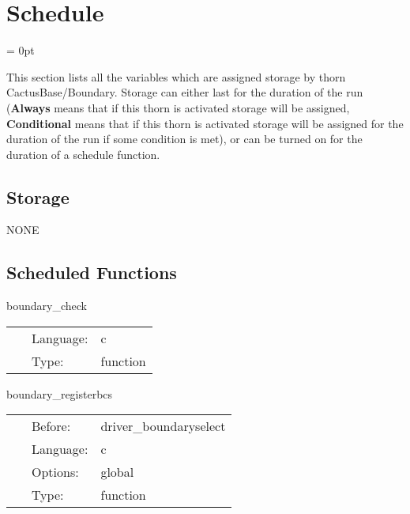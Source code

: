 
\section{Schedule} 


\parskip = 0pt


\noindent This section lists all the variables which are assigned storage by thorn CactusBase/Boundary.  Storage can either last for the duration of the run ({\bf Always} means that if this thorn is activated storage will be assigned, {\bf Conditional} means that if this thorn is activated storage will be assigned for the duration of the run if some condition is met), or can be turned on for the duration of a schedule function.


\subsection*{Storage}NONE
\subsection*{Scheduled Functions}
\vspace{5mm}


\hspace{5mm} boundary\_check 

\hspace{5mm}{\it check dimension of grid variables } 


\hspace{5mm}

 \begin{tabular*}{160mm}{cll} 
~ & Language:  & c \\ 
~ & Type:  & function \\ 
\end{tabular*} 


\vspace{5mm}


\hspace{5mm} boundary\_registerbcs 

\hspace{5mm}{\it register boundary conditions that this thorn provides } 


\hspace{5mm}

 \begin{tabular*}{160mm}{cll} 
~ & Before:  & driver\_boundaryselect \\ 
~ & Language:  & c \\ 
~ & Options:  & global \\ 
~ & Type:  & function \\ 
\end{tabular*} 


